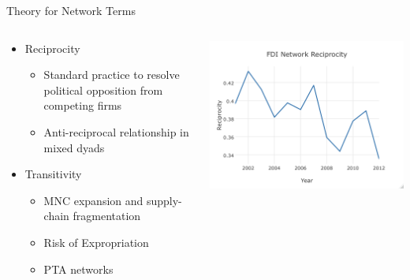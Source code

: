 \documentclass{beamer}
\begin{document}
\begin{frame}{Theory for Network Terms}
\begin{columns}[T]
    \begin{column}{.5\textwidth}

\begin{itemize}
\item{Reciprocity}
\begin{itemize}
\item{Standard practice to resolve political opposition from competing firms}
\item{Anti-reciprocal relationship in mixed dyads}
\end{itemize}
\end{itemize}
\vspace{10mm}
\begin{itemize}
\item{Transitivity}
\begin{itemize}
\item{MNC expansion and supply-chain fragmentation}
\item{Risk of Expropriation}
\item{PTA networks}
\end{itemize}
\end{itemize}
    \end{column}
    \begin{column}{.5\textwidth}
    \includegraphics[scale=.3]{slides_figures/reciprocity.png}\vfill

\end{column}
\end{columns}
\end{frame}
\end{document}
